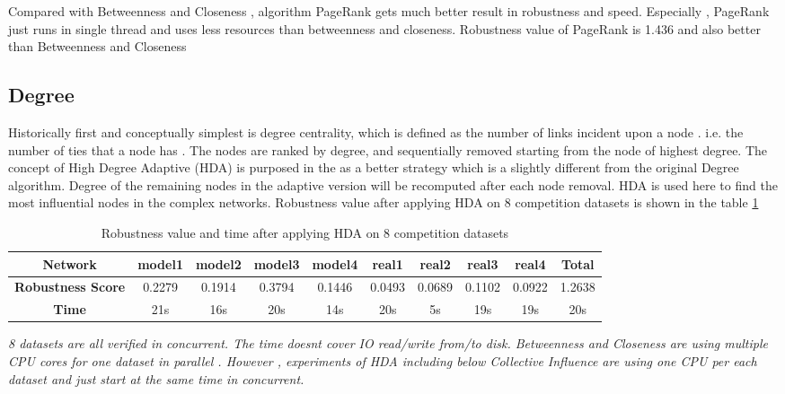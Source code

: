 \documentclass{article}
\begin{document}
		
	Compared with Betweenness and Closeness , algorithm PageRank gets much better result in robustness and speed. Especially , PageRank just runs in single thread and uses less resources than betweenness and closeness. Robustness value of PageRank is 1.436 and also better than Betweenness and Closeness 
	
	\subsection{Degree}		

	Historically first and conceptually simplest is degree centrality, which is defined as the number of links incident upon a node . i.e. the number of ties that a node has \cite{wikiCentrality}. The nodes are ranked by degree, and sequentially removed starting from the node of highest degree. The concept of High Degree Adaptive (HDA) is purposed in the \cite{morone2015influence} as a better strategy which is a slightly different from the original Degree algorithm. Degree of the remaining nodes in the adaptive version will be recomputed after each node removal. HDA is used here to find the most influential nodes in the complex networks. Robustness value after applying HDA on 8 competition datasets is shown in the table \ref{tab:table5}
	

		
	\begin{table}[]
		\begin{adjustwidth}{-1.3cm}{}		
			\begin{threeparttable}
				\centering
				\caption{Robustness value and time after applying HDA on 8 competition datasets}
				\label{tab:table5}
				
				\begin{tabular}{|c|c|c|c|c|c|c|c|c|c|}
					\hline
					\textbf{Network}          & \textbf{model1} & \textbf{model2} & \textbf{model3} & \textbf{model4} & \textbf{real1} & \textbf{real2} & \textbf{real3} & \textbf{real4} & \textbf{Total} \\ \hline
					\textbf{Robustness Score} & 0.2279          & 0.1914          & 0.3794          & 0.1446          & 0.0493         & 0.0689         & 0.1102         & 0.0922         & 1.2638         \\ \hline
					\textbf{Time}     & 21s             & 16s             & 20s             & 14s             & 20s            & 5s             & 19s            & 19s            & 20s            \\ \hline					
				\end{tabular}
				\begin{tablenotes}
					\small
					\item\textit{8 datasets are all verified in concurrent. The time doesn\textquotesingle t cover IO read/write from/to disk. Betweenness and Closeness are using multiple CPU cores for one dataset in parallel . However , experiments of HDA including below Collective Influence are using one CPU per each dataset and just start at the same time in concurrent.}
				\end{tablenotes}			
			\end{threeparttable}
		\end{adjustwidth}
	\end{table}
	
\end{document}
